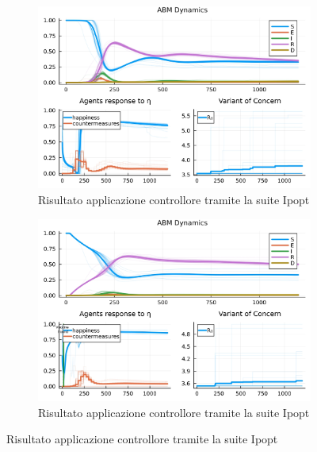 \begin{figure}[H]
	\centering
	\begin{subfigure}[b]{\textwidth}
		\centering
		\includegraphics[width=\textwidth]{img/SocialNetworkABM_IPOPT_CONTROL.jpg}
		\caption{Risultato applicazione controllore tramite la suite Ipopt}
		\label{fig:ipopt_res1}
	\end{subfigure}
	\hfill
	\begin{subfigure}[b]{\textwidth}
		\centering
		\includegraphics[width=\textwidth]{img/SocialNetworkABM_IPOPT_ALL.jpg}
		\caption{Risultato applicazione controllore tramite la suite Ipopt}
		\label{fig:ipopt_res2}
	\end{subfigure}
\end{figure}